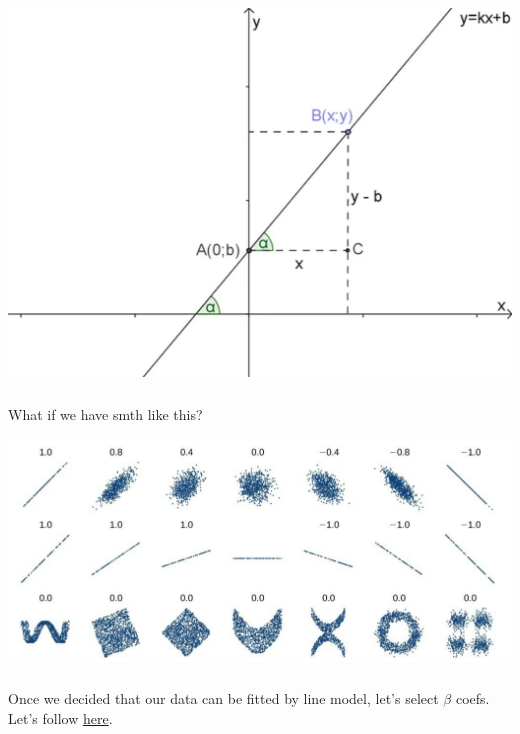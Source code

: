 \documentclass[t, 11pt]{beamer}
\begin{document}
\begin{frame}
	\frametitle{\insertsection} 
	\framesubtitle{\insertsubsection} 
	
	\begin{center}
		\includegraphics[scale=0.3]{lin1}
	\end{center}
	
\end{frame}	

\begin{frame}
	\frametitle{\insertsection} 
	\framesubtitle{\insertsubsection} 
	What if we have smth like this?
	\begin{center}
		\includegraphics[scale=0.3]{nonlin1}
	\end{center}
	
\end{frame}	

\begin{frame}
	\frametitle{\insertsection} 
	\framesubtitle{\insertsubsection} 
	
	Once we decided that our data can be fitted by line model, let's select $\beta$ coefs. Let's follow \href{http://jalammar.github.io/visual-interactive-guide-basics-neural-networks/}{here}.
	
\end{frame}	
\end{document}
